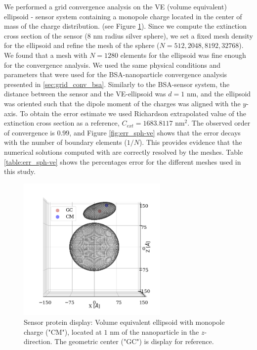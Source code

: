 We performed a grid convergence analysis on the VE (volume equivalent) ellipsoid - sensor system containing a monopole charge located 
in the center of mass of the charge distribution. (see Figure \ref{fig:one_ve_sketch}). Since we compute the extinction cross section of the sensor 
(8 nm radius silver sphere), we set a fixed mesh density for the ellipsoid and refine 
the mesh of the sphere ($N=512, 2048, 8192, 32768$). We found that a mesh with $N=1280$ elements for the ellipsoid was fine enough for the convergence analysis.
We used the same physical conditions and parameters that were used for the BSA-nanoparticle convergence analysis presented in
\ref{sec:grid_conv_bsa}. Similarly to the BSA-sensor system, the distance between the sensor and the VE-ellipsoid 
was $d=1$ nm, and the ellipsoid was oriented such that the dipole moment of the charges was aligned with the $y$-axis. To obtain the error 
estimate we used Richardson extrapolated value of the extinction cross section as a reference, $C_{ext} = 1683.8117$ nm$^2$.
The observed order of convergence is $0.99$, and Figure \ref{fig:err_sph-ve} shows that the error decays with the number of boundary elements ($1/N$). This provides
evidence that the numerical solutions computed with \pygbe are correctly resolved by the meshes.  Table \ref{table:err_sph-ve} shows the percentages error for the different 
meshes used in this study.

\begin{figure}%
    \centering
    \includegraphics[width=0.65\textwidth]{viz/one_ve_cm_gc_display.png} 
    \caption{Sensor protein display: Volume equivalent ellipsoid with monopole charge ("CM"), located at $1$ nm of the 
    nanoparticle in the $z$-direction. The geometric center ("GC") is display for reference.}
    \label{fig:one_ve_sketch}
 \end{figure}


